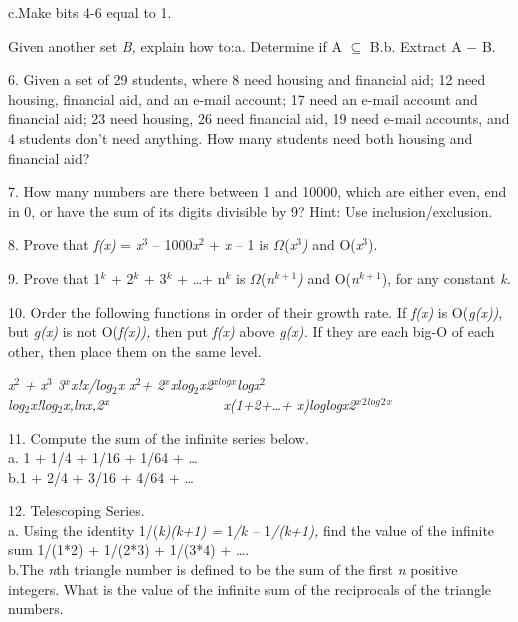 \documentclass{article}
\newcommand{\tab}{\makebox[4em]{}}
\begin{document}
c.\tab Make bits 4-6 equal to 1.


Given another set \textit{B,} explain how to:\tab a. Determine if A \ensuremath{\subseteq} 
B.\tab b. Extract A \ensuremath{-} B.


6.\tab 
Given a set of 29 students, where 8 need housing and financial 
aid; 12 need housing, financial aid, and an e-mail account; 17 
need an e-mail account and financial aid; 23 need housing, 26 
need financial aid, 19 need e-mail accounts, and 4 students don't 
need anything. How many students need both housing and financial 
aid?


7.\tab 
How many numbers are there between 1 and 10000, which are either 
even, end in 0, or have the sum of its digits divisible by 9? 
Hint: Use inclusion/exclusion.


8.\tab 
Prove that \textit{f(x)} = \textit{x}$^{3}$ -- 1000\textit{x}$^{2}$ + \textit{x} -- 1 is \ensuremath{\Omega}(\textit{x}$^{\mathit{3}}$\textit{)} 
and O(\textit{x}$^{\mathit{3}}$).


9.\tab 
Prove that 1$^{k}$ + 2$^{k}$ + 3$^{k}$ + \dots  + n$^{k}$ is \ensuremath{\Omega}(\textit{n}$^{\mathit{k+1}}$\textit{)} 
and O(\textit{n}$^{\mathit{k+1}}$), for any constant \textit{k.} 


10.\tab 
Order the following functions in order of their growth rate. 
If \textit{f(x)} is O(\textit{g(x))}, but \textit{g(x)} is not O(\textit{f(x)),} then 
put \textit{f(x)} above \textit{g(x).} If they are each big-O of each other, 
then place them on the same level.



\textit{x}$^{\mathit{2}}$ \textit{+ x}$^{\mathit{3}}$ \tab \tab \textit{3}$^{\mathit{x}}$\tab \textit{x!\tab x/log}$_{\mathit{2}}$\textit{x 
\tab x}$^{\mathit{2}}$\textit{+ 2}$^{\mathit{x}}$\tab \tab \tab \textit{xlog}$_{\mathit{2}}$\textit{x\tab \tab 2}$^{\mathit{xlogx}}$\tab \textit{logx}$^{\mathit{2}}$\\
\textit{log}$_{\mathit{2}}$\textit{x!\tab \tab log}$_{\mathit{2}}$\textit{x,\tab lnx,\tab 2}$^{\mathit{x\tab \tab }}$\textit{x(1+2+\dots + 
x)\tab \tab loglogx\tab \tab 2}$^{\mathit{x}}$$^{\mathit{2}}$\tab $^{\mathit{log}}$$^{\mathit{2}}$$^{\mathit{x}}$

11.\tab 
Compute the sum of the infinite series below.\\
a.\tab 
1 + 1/4 + 1/16 + 1/64 + \dots \\
b.\tab 1 + 2/4 + 3/16 + 4/64 + \dots 


12.\tab 
 Telescoping Series.\\
a.\tab 
Using the identity 1/(\textit{k)(k+1) =} 1\textit{/k --} 1\textit{/(k+1),} find 
the value of the infinite sum 1/(1*2) + 1/(2*3) + 1/(3*4) + \dots .\\
b.\tab The \textit{n}th triangle number is defined to be the sum of the 
first \textit{n} positive integers. What is the value of the infinite 
sum of the reciprocals of the triangle numbers.
\end{document}
